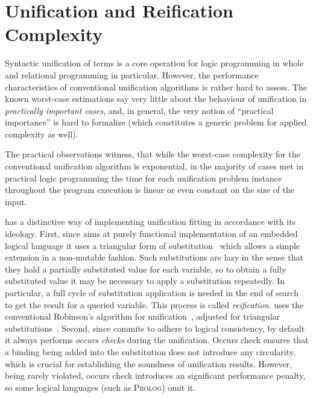 \section{Unification and Reification Complexity}
\label{sec:uni-rei}

Syntactic unification of terms is a core operation for logic programming in whole and relational programming in particular.
However, the performance characteristics of conventional unification algorithms is rather hard to assess.
The known worst-case estimations say very little about the behaviour of unification in \emph{practically important cases}, and, in
general, the very notion of ``practical importance'' is hard to formalize (which constitutes a generic problem for applied complexity as well).

The practical observations witness, that while the worst-case complexity for the conventional unification algorithm is exponential, in the majority of
cases met in practical logic programming the time for each unification problem instance throughout the program execution is linear or even constant on the size of the input.


\mK has a distinctive way of implementing unification fitting in accordance with its ideology. First, since \mK aims at purely functional implementation of an embedded logical
language it uses a triangular form of substitution~\cite{UnificationTheory} which allows a simple extension in a non-mutable fashion. Such substitutions are lazy in the sense that
they hold a partially substituted value for each variable, so to obtain a fully substituted value it may be necessary to apply a substitution repeatedly. In particular, a full
cycle of substitution application is needed in the end of search to get the result for a queried variable. This process is called \emph{reification}. \mK uses the conventional Robinson's
algorithm for unification~\cite{UnificationTheory}, adjusted for triangular substitutions~\cite{TRS}. Second, since \mK commits to adhere to logical consistency, by default it always
performs \emph{occurs checks} during the unification. Occurs check ensures that a binding being added into the substitution does not introduce any circularity, which is crucial for
establishing the soundness of unification results. However, being rarely violated, occurs check introduces an significant performance penalty, so some logical languages (such as \textsc{Prolog})
omit it.

